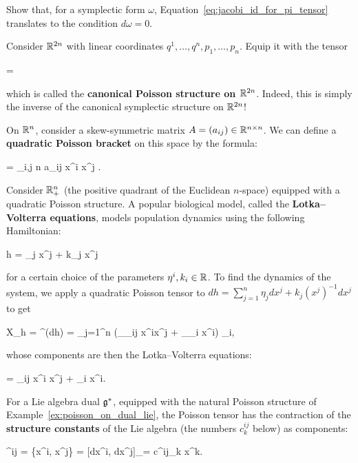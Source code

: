 \documentclass[main.tex]{subfiles}
\begin{document}
\begin{exercise}
	Show that, for a symplectic form $\omega$, Equation~\eqref{eq:jacobi_id_for_pi_tensor} translates to the condition $d\omega = 0$.
\end{exercise}
\begin{example}
\label{ex:canonical_poisson}
	Consider $\mathbb{R}^{2n}$ with linear coordinates $q^1, \ldots, q^n, p_1, \ldots, p_n$. Equip it with the tensor
	\begin{eqalign}
		\Pi =  \wedge {}
	\end{eqalign}
	which is called the \textbf{canonical Poisson structure on $\mathbb{R}^{2n}$}. Indeed, this is simply the inverse of the canonical symplectic structure on $\mathbb{R}^{2n}$!
\end{example}
\begin{example}
\label{ex:quadratic_poisson}
	On $\mathbb{R}^n$, consider a skew-symmetric matrix $A = (a_{ij}) \in \mathbb{R}^{n \times n}$. We can define a \textbf{quadratic Poisson bracket} on this space by the formula:
	\begin{eqalign}
		\Pi =  \sum_{i,j \leq n} a_{ij} x^i x^j  \wedge \pder{}{x_j}.
	\end{eqalign}
\end{example}
\begin{example}
	Consider $\mathbb{R}^n_+$ (the positive quadrant of the Euclidean $n$-space) equipped with a quadratic Poisson structure. A popular biological model, called the \textbf{Lotka--Volterra equations}, models population dynamics using the following Hamiltonian:
	\begin{eqalign}
		h = \eta_j x^j + k_j \log x^j
	\end{eqalign}
	for a certain choice of the parameters $\eta^i, k_i \in \mathbb{R}$. To find the dynamics of the system, we apply a quadratic Poisson tensor to $dh = \sum_{j=1}^n \eta_j dx^j + k_j (x^j)^{-1} dx^j$ to get
	\begin{eqalign}
		X_h = \Pi^\sharp(dh) = \sum_{j=1}^n (_{\gamma_{ij}} x^ix^j + _{\varepsilon_i} x^i) \partial_i,
	\end{eqalign}
	whose components are then the Lotka--Volterra equations:
	\begin{eqalign}
		 = \gamma_{ij} x^i x^j + \varepsilon_i x^i.
	\end{eqalign}
\end{example}
\begin{example}
	For a Lie algebra dual $\mathfrak g^*$, equipped with the natural Poisson structure of Example~\ref{ex:poisson_on_dual_lie}, the Poisson tensor has the contraction of the \textbf{structure constants} of the Lie algebra (the numbers $c^{ij}_k$ below) as components:
	\begin{eqalign}
		\Pi^{ij} = \{x^i, x^j\} = [dx^i, dx^j]_\lalg = c^{ij}_k x^k.
	\end{eqalign}
\end{example}
\end{document}
